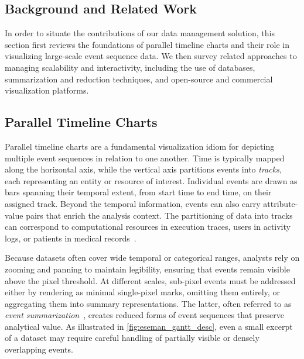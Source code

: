 \begin{refsection}
\section{Background and Related Work}
\label{sec:eseman_background}

In order to situate the contributions of our data management solution, this section first reviews the foundations of parallel timeline charts and their role in visualizing large-scale event sequence data. We then survey related approaches to managing scalability and interactivity, including the use of databases, summarization and reduction techniques, and open-source and commercial visualization platforms.


\subsection{Parallel Timeline Charts}
Parallel timeline charts are a fundamental visualization idiom for depicting multiple event sequences in relation to one another. Time is typically mapped along the horizontal axis, while the vertical axis partitions events into \textit{tracks}, each representing an entity or resource of interest. Individual events are drawn as bars spanning their temporal extent, from start time to end time, on their assigned track. Beyond the temporal information, events can also carry attribute-value pairs that enrich the analysis context. The partitioning of data into tracks can correspond to computational resources in execution traces, users in activity logs, or patients in medical records~\cite{isaacs2014state, ezzati2017multi, wilson2003gantt, jo2014livegantt, antweiler2022uncovering, sakin2024gantttaxonomy}.


Because datasets often cover wide temporal or categorical ranges, analysts rely on zooming and panning to maintain legibility, ensuring that events remain visible above the pixel threshold. At different scales, sub-pixel events must be addressed either by rendering as minimal single-pixel marks, omitting them entirely, or aggregating them into summary representations. The latter, often referred to as \textit{event summarization}~\cite{guo2021survey}, creates reduced forms of event sequences that preserve analytical value. As illustrated in \autoref{fig:eseman_gantt_desc}, even a small excerpt of a dataset may require careful handling of partially visible or densely overlapping events.


\end{refsection}
